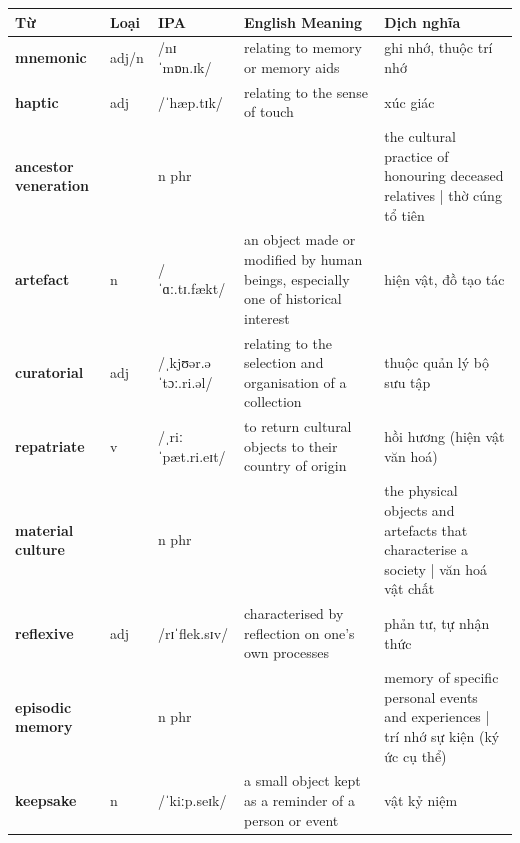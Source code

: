 \vspace{0.8em}
\begin{center}
\renewcommand{\arraystretch}{1.65}
\begin{tabularx}{\textwidth}{|V{0.22\textwidth}|C{0.07\textwidth}|I{0.20\textwidth}|Y|V{0.18\textwidth}|}
\hline
{}
\textbf{Từ} & \textbf{Loại} & \textbf{IPA} & \textbf{English Meaning} & \textbf{Dịch nghĩa} \\
\hline
\textbf{mnemonic} & adj/n & /nɪˈmɒn.ɪk/ & relating to memory or memory aids & ghi nhớ, thuộc trí nhớ \\ \hline
\textbf{haptic} & adj & /ˈhæp.tɪk/ & relating to the sense of touch & xúc giác \\ \hline
\textbf{ancestor veneration} & & n phr & & the cultural practice of honouring deceased relatives | thờ cúng tổ tiên \\ \hline
\textbf{artefact} & n & /ˈɑː.tɪ.fækt/ & an object made or modified by human beings, especially one of historical interest & hiện vật, đồ tạo tác \\ \hline
\textbf{curatorial} & adj & /ˌkjʊər.əˈtɔː.ri.əl/ & relating to the selection and organisation of a collection & thuộc quản lý bộ sưu tập \\ \hline
\textbf{repatriate} & v & /ˌriːˈpæt.ri.eɪt/ & to return cultural objects to their country of origin & hồi hương (hiện vật văn hoá) \\ \hline
\textbf{material culture} & & n phr & & the physical objects and artefacts that characterise a society | văn hoá vật chất \\ \hline
\textbf{reflexive} & adj & /rɪˈflek.sɪv/ & characterised by reflection on one's own processes & phản tư, tự nhận thức \\ \hline
\textbf{episodic memory} & & n phr & & memory of specific personal events and experiences | trí nhớ sự kiện (ký ức cụ thể) \\ \hline
\textbf{keepsake} & n & /ˈkiːp.seɪk/ & a small object kept as a reminder of a person or event & vật kỷ niệm \\ \hline
\end{tabularx}
\end{center}

\newpage

